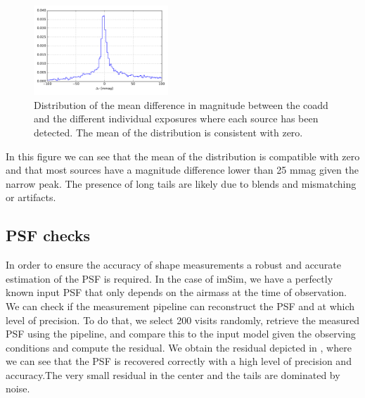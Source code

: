 \documentclass[\docopts]{\docclass}
\begin{document}
\begin{figure}
  \centering
  \includegraphics[width=0.45\textwidth]{photometry_internal_10visits_imsim_undithered}
  \caption{Distribution of the mean difference in magnitude between the coadd and the different individual exposures
  where each source has been detected. The mean of the distribution is consistent with zero.}
  \label{fig:internal_photometry_a}
\end{figure}

In this figure we can see that the mean of the distribution is compatible with zero and that most sources have a magnitude difference lower
than 25 mmag given the narrow peak. The presence of long tails are likely due to blends and mismatching or artifacts.

\subsection{PSF checks}
\label{sec:psf_checks}

In order to ensure the accuracy of shape measurements a robust and accurate estimation of the PSF is required. In the case of imSim, we have
a perfectly known input PSF that only depends on the airmass at the time of observation. We can check if the measurement pipeline can reconstruct
the PSF and at which level of precision. To do that, we select 200 visits randomly, retrieve the measured PSF using the pipeline, and compare this
to the input model given the observing conditions and compute the residual. We obtain the residual depicted in , where we can see that the PSF is recovered correctly with a high level of precision and accuracy.The very small residual in the center and the tails are dominated by noise.
\end{document}
